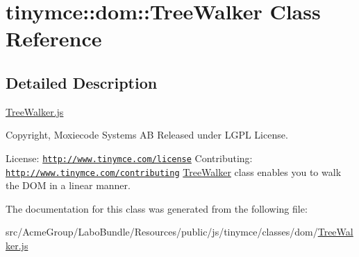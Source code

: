 \hypertarget{classtinymce_1_1dom_1_1_tree_walker}{\section{tinymce\+:\+:dom\+:\+:Tree\+Walker Class Reference}
\label{classtinymce_1_1dom_1_1_tree_walker}
}


\subsection{Detailed Description}
\hyperlink{_tree_walker_8js}{Tree\+Walker.\+js}

Copyright, Moxiecode Systems A\+B Released under L\+G\+P\+L License.

License\+: \href{http://www.tinymce.com/license}{\tt http\+://www.\+tinymce.\+com/license} Contributing\+: \href{http://www.tinymce.com/contributing}{\tt http\+://www.\+tinymce.\+com/contributing} \hyperlink{classtinymce_1_1dom_1_1_tree_walker}{Tree\+Walker} class enables you to walk the D\+O\+M in a linear manner. 

The documentation for this class was generated from the following file\+:\begin{DoxyCompactItemize}
\item 
src/\+Acme\+Group/\+Labo\+Bundle/\+Resources/public/js/tinymce/classes/dom/\hyperlink{_tree_walker_8js}{Tree\+Walker.\+js}\end{DoxyCompactItemize}

